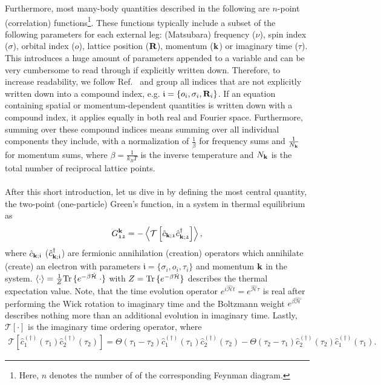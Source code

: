 \documentclass[\main/main.tex]{subfiles}
\begin{document}
Furthermore, most many-body quantities described in the following are $n$-point (correlation) functions\footnote{Here, $n$ denotes the number of  of the corresponding Feynman diagram.}. These functions typically include a subset of the following parameters for each external leg: (Matsubara) frequency ($\nu$), spin index ($\sigma$), orbital index ($o$), lattice position ($\textbf{R}$), momentum ($\textbf{k}$) or imaginary time ($\tau$). This introduces a huge amount of parameters appended to a variable and can be very cumbersome to read through if explicitly written down. Therefore, to increase readability, we follow Ref.~\cite{Bickers1989} and group all indices that are not explicitly written down into a compound index, e.g. $\mathfrak{i}=\{o_i, \sigma_i, \textbf{R}_i\}$. If an equation containing spatial or momentum-dependent quantities is written down with a compound index, it applies equally in both real and Fourier space. Furthermore, summing over these compound indices means summing over all individual components they include, with a normalization of $\frac 1\beta$ for frequency sums and $\frac{1}{N_{\textbf{k}}}$ for momentum sums, where $\beta=\frac{1}{k_B T}$ is the inverse temperature and $N_{\textbf{k}}$ is the total number of reciprocal lattice points. 
\\\\
After this short introduction, let us dive in by defining the most central quantity, the two-point (one-particle) Green's function, in a system in thermal equilibrium as
\begin{align}\label{eq:one_p_green_expectation_val}
	G_{\mathfrak{12}}^{\textbf{k}}=-\left\langle \mathcal{T}\left [\hat{c}_{\textbf{k};\mathfrak{1}}\hat{c}^{\dagger}_{\textbf{k};\mathfrak{2}}\right ]\right\rangle,
\end{align}
where $\hat{c}_{\textbf{k};\mathfrak{i}}$ ($\hat{c}^{\dagger}_{\textbf{k};\mathfrak{i}}$) are fermionic annihilation (creation) operators which annihilate (create) an electron with parameters $\mathfrak{i}=\{\sigma_i, o_i, \tau_i\}$ and momentum $\textbf{k}$ in the system. $\left\langle \cdot\right\rangle=\frac{1}{Z}\mathrm{Tr}\, \{ e^{-\beta\hat{\mathcal{H}}}\;\cdot \}$ with $Z=\mathrm{Tr}\, \{ e^{-\beta\hat{\mathcal{H}}}\}$ describes the thermal expectation value. Note, that the time evolution operator $e^{i\hat{\mathcal{H}}t}=e^{\hat{\mathcal{H}}\tau}$ is real after performing the Wick rotation to imaginary time and the Boltzmann weight $e^{\beta\hat{\mathcal{H}}}$ describes nothing more than an additional evolution in imaginary time. Lastly, $\mathcal{T}[\cdot]$ is the imaginary time ordering operator, where
\begin{align}
	\mathcal{T}\left [\hat{c}^{(\dagger)}_{\mathfrak{1}}(\tau_1)\hat{c}^{(\dagger)}_{\mathfrak{2}}(\tau_2)\right ]=\Theta(\tau_1-\tau_2)\hat{c}^{(\dagger)}_{\mathfrak{1}}(\tau_1)\hat{c}^{(\dagger)}_{\mathfrak{2}}(\tau_2)-\Theta(\tau_2-\tau_1)\hat{c}^{(\dagger)}_{\mathfrak{2}}(\tau_2)\hat{c}^{(\dagger)}_{\mathfrak{1}}(\tau_1).
\end{align}
\end{document}
